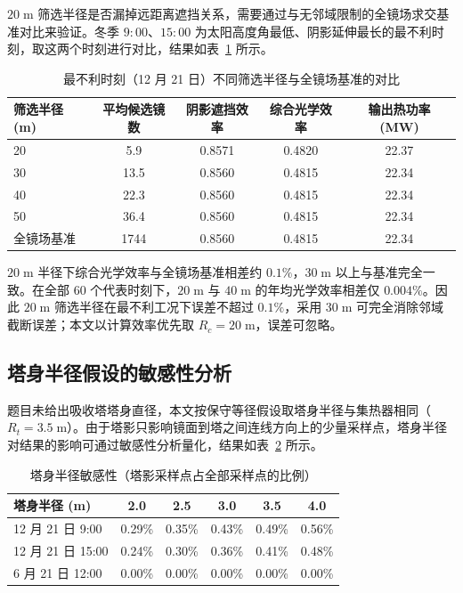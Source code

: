 \documentclass[12pt,a4paper,fontset=fandol]{ctexart}
\begin{document}
$20\;\mathrm{m}$ 筛选半径是否漏掉远距离遮挡关系，需要通过与无邻域限制的全镜场求交基准对比来验证。冬季 $9{:}00$、$15{:}00$ 为太阳高度角最低、阴影延伸最长的最不利时刻，取这两个时刻进行对比，结果如表~\ref{tab:neighbor_check} 所示。

\begin{table}[H]
    \centering
    \small
    \caption{最不利时刻（12 月 21 日）不同筛选半径与全镜场基准的对比}
    \label{tab:neighbor_check}
    \begin{tabular}{lcccc}
        \toprule
        筛选半径 (m) & 平均候选镜数 & 阴影遮挡效率 & 综合光学效率 & 输出热功率 (MW) \\
        \midrule
        20 & 5.9 & 0.8571 & 0.4820 & 22.37 \\
        30 & 13.5 & 0.8560 & 0.4815 & 22.34 \\
        40 & 22.3 & 0.8560 & 0.4815 & 22.34 \\
        50 & 36.4 & 0.8560 & 0.4815 & 22.34 \\
        全镜场基准 & 1744 & 0.8560 & 0.4815 & 22.34 \\
        \bottomrule
    \end{tabular}
\end{table}

$20\;\mathrm{m}$ 半径下综合光学效率与全镜场基准相差约 $0.1\%$，$30\;\mathrm{m}$ 以上与基准完全一致。在全部 $60$ 个代表时刻下，$20\;\mathrm{m}$ 与 $40\;\mathrm{m}$ 的年均光学效率相差仅 $0.004\%$。因此 $20\;\mathrm{m}$ 筛选半径在最不利工况下误差不超过 $0.1\%$，采用 $30\;\mathrm{m}$ 可完全消除邻域截断误差；本文以计算效率优先取 $R_c = 20\;\mathrm{m}$，误差可忽略。

\subsection{塔身半径假设的敏感性分析}

题目未给出吸收塔塔身直径，本文按保守等径假设取塔身半径与集热器相同（$R_t = 3.5\;\mathrm{m}$）。由于塔影只影响镜面到塔之间连线方向上的少量采样点，塔身半径对结果的影响可通过敏感性分析量化，结果如表~\ref{tab:tower_sens} 所示。

\begin{table}[H]
    \centering
    \small
    \caption{塔身半径敏感性（塔影采样点占全部采样点的比例）}
    \label{tab:tower_sens}
    \begin{tabular}{lccccc}
        \toprule
        塔身半径 (m) & 2.0 & 2.5 & 3.0 & 3.5 & 4.0 \\
        \midrule
        12 月 21 日 9:00 & 0.29\% & 0.35\% & 0.43\% & 0.49\% & 0.56\% \\
        12 月 21 日 15:00 & 0.24\% & 0.30\% & 0.36\% & 0.41\% & 0.48\% \\
        6 月 21 日 12:00 & 0.00\% & 0.00\% & 0.00\% & 0.00\% & 0.00\% \\
        \bottomrule
    \end{tabular}
\end{table}
\end{document}
